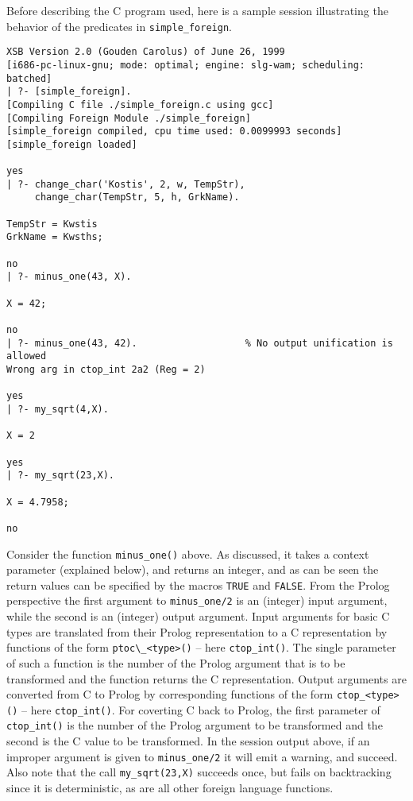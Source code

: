 Before describing the C program used, here is a sample session
illustrating the behavior of the predicates in {\tt simple\_foreign}.

\begin{small}
\begin{verbatim}
XSB Version 2.0 (Gouden Carolus) of June 26, 1999
[i686-pc-linux-gnu; mode: optimal; engine: slg-wam; scheduling: batched]
| ?- [simple_foreign].
[Compiling C file ./simple_foreign.c using gcc]
[Compiling Foreign Module ./simple_foreign]
[simple_foreign compiled, cpu time used: 0.0099993 seconds]
[simple_foreign loaded]

yes
| ?- change_char('Kostis', 2, w, TempStr), 
     change_char(TempStr, 5, h, GrkName).  

TempStr = Kwstis
GrkName = Kwsths;

no
| ?- minus_one(43, X).

X = 42;

no
| ?- minus_one(43, 42).                   % No output unification is allowed
Wrong arg in ctop_int 2a2 (Reg = 2)

yes
| ?- my_sqrt(4,X). 

X = 2

yes
| ?- my_sqrt(23,X).

X = 4.7958;

no
\end{verbatim}
\end{small}

Consider the function {\tt minus\_one()} above.  As discussed, it
takes a context parameter (explained below), and returns an integer,
and as can be seen the return values can be specified by the macros
{\tt TRUE} and {\tt FALSE}.  From the Prolog perspective the first
argument to {\tt minus\_one/2} is an (integer) input argument, while
the second is an (integer) output argument.  Input arguments for basic
C types are translated from their Prolog representation to a C
representation by functions of the form \verb|ptoc\_<type>()| -- here
{\tt ctop\_int()}.  The single parameter of such a function is the
number of the Prolog argument that is to be transformed and the
function returns the C representation.  Output arguments are converted
from C to Prolog by corresponding functions of the form
\verb|ctop_<type>()| -- here {\tt ctop\_int()}.  For coverting C back
to Prolog, the first parameter of {\tt ctop\_int()} is the number of
the Prolog argument to be transformed and the second is the C value to
be transformed.  In the session output above, if an improper argument
is given to {\tt minus\_one/2} it will emit a warning, and succeed.
Also note that the call {\tt my\_sqrt(23,X)} succeeds once, but fails
on backtracking since it is deterministic, as are all other foreign
language functions.

